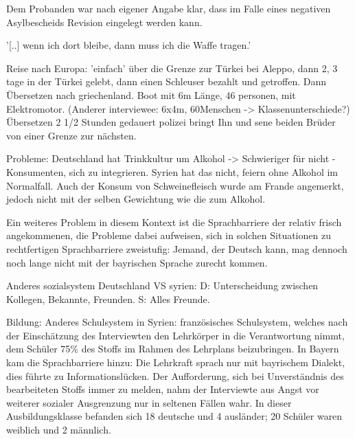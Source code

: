 \documentclass[12pt,oneside]{article}
\begin{document}
Dem Probanden war nach eigener Angabe klar, dass im Falle eines negativen Asylbescheids Revision eingelegt werden kann.

'[..] wenn ich dort bleibe, dann muss ich die Waffe tragen.'

Reise nach Europa: 'einfach' über die Grenze zur Türkei bei Aleppo, dann 2, 3 tage in der Türkei gelebt, dann einen Schleuser bezahlt und getroffen. Dann Übersetzen nach griechenland. Boot mit 6m Länge, 46 personen, mit Elektromotor. (Anderer interviewee: 6x4m, 60Menschen -> Klassenunterschiede?)
Übersetzen 2 1/2 Stunden gedauert
polizei bringt Ihn und sene beiden Brüder von einer Grenze zur nächsten. 


Probleme: 
    Deutschland hat Trinkkultur um Alkohol -> Schwieriger für nicht - Konsumenten, sich zu integrieren. Syrien hat das nicht, feiern ohne Alkohol im Normalfall.
    Auch der Konsum von Schweinefleisch wurde am Frande angemerkt, jedoch nicht mit der selben Gewichtung wie die zum Alkohol.
    
    Ein weiteres Problem in diesem Kontext ist die Sprachbarriere der relativ frisch angekommenen, die Probleme dabei aufweisen, sich in solchen Situationen zu rechtfertigen
    Sprachbarriere zweistufig: Jemand, der Deutsch kann, mag dennoch noch lange nicht mit der bayrischen Sprache zurecht kommen.
    
    Anderes sozialsystem Deutschland VS syrien: 
        D: Unterscheidung zwischen Kollegen, Bekannte, Freunden.
        S: Alles Freunde.
        
    Bildung: Anderes Schulsystem in Syrien: französisches Schulsystem, welches nach der Einschätzung des Interviewten den Lehrkörper in die Verantwortung nimmt, dem Schüler 75\% des Stoffs im Rahmen des Lehrplans beizubringen. In Bayern kam die Sprachbarriere hinzu: Die Lehrkraft sprach nur mit bayrischem Dialekt, dies führte zu Informationslücken. Der Aufforderung, sich bei Unverständnis des bearbeiteten Stoffs immer zu melden, nahm der Interviewte aus Angst vor weiterer sozialer Ausgrenzung nur in seltenen Fällen wahr.\newline
    In dieser Ausbildungsklasse befanden sich 18 deutsche und 4 ausländer; 20 Schüler waren weiblich und 2 männlich.
\end{document}
